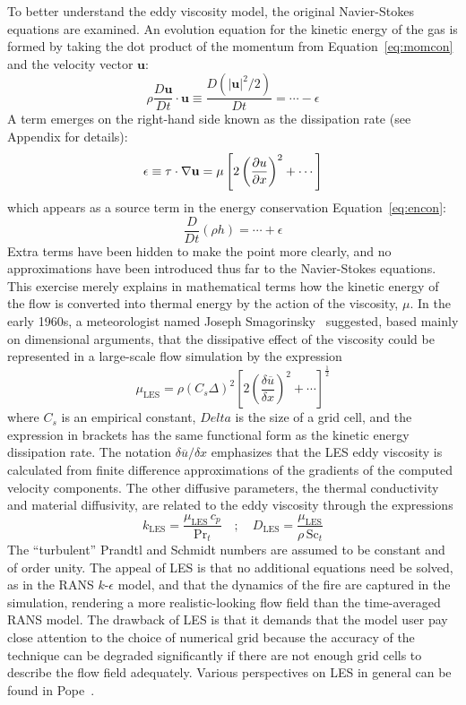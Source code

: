 \documentclass[graybox]{svmult}
\begin{document}
To better understand the eddy viscosity model, the original Navier-Stokes equations are examined. An evolution equation for the kinetic energy of the gas is formed by taking the dot product of the momentum from Equation~\ref{eq:momcon} and the velocity vector $\mathbf{u}$:
\begin{equation}
\rho \frac{D \mathbf{u}}{Dt} \cdot \mathbf{u} \equiv \frac{D(|\mathbf{u}|^2/2)}{Dt} = \cdots - \epsilon
\label{eq:momdotu}
\end{equation}
A term emerges on the right-hand side known as the dissipation rate (see Appendix for details):
\begin{equation}
\epsilon \equiv \tens{\tau} \cdot \nabla \mathbf{u} = \mu \left[ 2 \left( \frac{\partial u}{\partial x} \right)^2 + \cdots \right]
\label{eq:epsilondef}
\end{equation}
which appears as a source term in the energy conservation Equation~\ref{eq:encon}:
\begin{equation}
\frac{D}{Dt} (\rho h) = \cdots + \epsilon
\end{equation}
Extra terms have been hidden to make the point more clearly, and no approximations have been introduced thus far to the Navier-Stokes equations. This exercise merely explains in mathematical terms how the kinetic energy of the flow is converted into thermal energy by the action of the viscosity, $\mu$. In the early 1960s, a meteorologist named Joseph Smagorinsky~\cite{Smagorinsky} suggested, based mainly on dimensional arguments, that the dissipative effect of the viscosity could be represented in a large-scale flow simulation by the expression
\begin{equation}
\mu_{\mathrm{LES}} = \rho (C_s \Delta)^2 \left[ 2 \left( \frac{\delta \overline{u}}{\delta x} \right)^2 + \cdots \right]^{\frac{1}{2}}
\label{eq:muLES}
\end{equation}
where $C_s$ is an empirical constant, $Delta$ is the size of a grid cell, and the expression in brackets has the same functional form as the kinetic energy dissipation rate. The notation $\delta \overline{u}/\delta x$ emphasizes that the LES  eddy viscosity is calculated from finite difference approximations of the gradients of the computed velocity components. The other diffusive parameters, the thermal conductivity and material diffusivity, are related to the eddy viscosity through the expressions
\begin{equation}
k_{\mathrm{LES}} = \frac{\mu_{\mathrm{LES}} \, c_p}{\mathrm{Pr}_t} \quad ; \quad D_{\mathrm{LES}} = \frac{\mu_{\mathrm{LES}}}{\rho \, \mathrm{Sc}_t}
\end{equation}
The ``turbulent'' Prandtl and Schmidt numbers are assumed to be constant and of order unity. The appeal of LES is that no additional equations need be solved, as in the RANS $k$-$\epsilon$  model, and that the dynamics of the fire are captured in the simulation, rendering a more realistic-looking flow field than the time-averaged RANS model. The drawback of LES is that it demands that the model user pay close attention to the choice of numerical grid because the accuracy of the technique can be degraded significantly if there are not enough grid cells to describe the flow field adequately. Various perspectives on LES in general can be found in Pope~\cite{Pope}.
\end{document}
